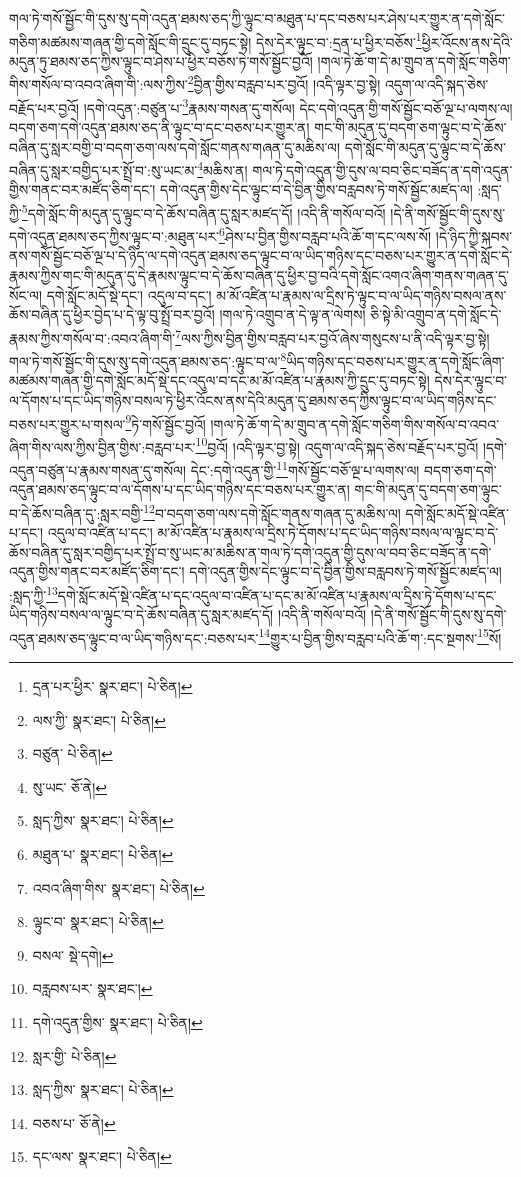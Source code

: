 གལ་ཏེ་གསོ་སྦྱོང་གི་དུས་སུ་དགེ་འདུན་ཐམས་ཅད་ཀྱི་ལྟུང་བ་མཐུན་པ་དང་བཅས་པར་ཤེས་པར་གྱུར་ན་དགེ་སློང་གཅིག་མཚམས་གཞན་གྱི་དགེ་སློང་གི་དྲུང་དུ་བཏང་སྟེ། དེས་དེར་ལྟུང་བ་:དྲན་པ་ཕྱིར་བཅོས་\footnote{དྲན་པར་ཕྱིར་  སྣར་ཐང་།  པེ་ཅིན། }ཕྱིར་འོངས་ནས་དེའི་མདུན་ཏུ་ཐམས་ཅད་ཀྱིས་ལྟུང་བ་ཤེས་པ་ཕྱིར་བཅོས་ཏེ་གསོ་སྦྱོང་བྱའོ། །གལ་ཏེ་ཆོ་ག་དེ་མ་གྲུབ་ན་དགེ་སློང་གཅིག་གིས་གསོལ་བ་འབའ་ཞིག་གི་:ལས་ཀྱིས་\footnote{ལས་ཀྱི་  སྣར་ཐང་།  པེ་ཅིན། }བྱིན་གྱིས་བརླབ་པར་བྱའོ། །འདི་ལྟར་བྱ་སྟེ། འདུག་ལ་འདི་སྐད་ཅེས་བརྗོད་པར་བྱའོ། །དགེ་འདུན་:བཙུན་པ་\footnote{བཙུན་  པེ་ཅིན། }རྣམས་གསན་དུ་གསོལ། དེང་དགེ་འདུན་གྱི་གསོ་སྦྱོང་བཅོ་ལྔ་པ་ལགས་ལ། བདག་ཅག་དགེ་འདུན་ཐམས་ཅད་ནི་ལྟུང་བ་དང་བཅས་པར་གྱུར་ན། གང་གི་མདུན་དུ་བདག་ཅག་ལྟུང་བ་དེ་ཆོས་བཞིན་དུ་སླར་བགྱི་བ་བདག་ཅག་ལས་དགེ་སློང་གནས་གཞན་དུ་མཆིས་ལ། དགེ་སློང་གི་མདུན་དུ་ལྟུང་བ་དེ་ཆོས་བཞིན་དུ་སླར་བགྱིད་པར་སྤྲོ་བ་:སུ་ཡང་མ་\footnote{སུ་ཡང་  ཅོ་ནེ། }མཆིས་ན། གལ་ཏེ་དགེ་འདུན་གྱི་དུས་ལ་བབ་ཅིང་བཟོད་ན་དགེ་འདུན་གྱིས་གནང་བར་མཛོད་ཅིག་དང་། དགེ་འདུན་གྱིས་དེང་ལྟུང་བ་དེ་བྱིན་གྱིས་བརླབས་ཏེ་གསོ་སྦྱོང་མཛད་ལ། :སླད་ཀྱི་\footnote{སླད་ཀྱིས་  སྣར་ཐང་།  པེ་ཅིན། }དགེ་སློང་གི་མདུན་དུ་ལྟུང་བ་དེ་ཆོས་བཞིན་དུ་སླར་མཛད་དོ། །འདི་ནི་གསོལ་བའོ། །དེ་ནི་གསོ་སྦྱོང་གི་དུས་སུ་དགེ་འདུན་ཐམས་ཅད་ཀྱིས་ལྟུང་བ་:མཐུན་པར་\footnote{མཐུན་པ་  སྣར་ཐང་།  པེ་ཅིན། }ཤེས་པ་བྱིན་གྱིས་བརླབ་པའི་ཆོ་ག་དང་ལས་སོ། །དེ་ཉིད་ཀྱི་སྐབས་ནས་གསོ་སྦྱོང་བཅོ་ལྔ་པ་དེ་ཉིད་ལ་དགེ་འདུན་ཐམས་ཅད་ལྟུང་བ་ལ་ཡིད་གཉིས་དང་བཅས་པར་གྱུར་ན་དགེ་སློང་དེ་རྣམས་ཀྱིས་གང་གི་མདུན་དུ་དེ་རྣམས་ལྟུང་བ་དེ་ཆོས་བཞིན་དུ་ཕྱིར་བྱ་བའི་དགེ་སློང་འགའ་ཞིག་གནས་གཞན་དུ་སོང་ལ། དགེ་སློང་མདོ་སྡེ་དང་། འདུལ་བ་དང་། མ་མོ་འཛིན་པ་རྣམས་ལ་དྲིས་ཏེ་ལྟུང་བ་ལ་ཡིད་གཉིས་བསལ་ནས་ཆོས་བཞིན་དུ་ཕྱིར་བྱེད་པ་དེ་ལྟ་བུ་སྤྲོ་བར་བྱའོ། །གལ་ཏེ་འགྲུབ་ན་དེ་ལྟ་ན་ལེགས། ཅི་སྟེ་མི་འགྲུབ་ན་དགེ་སློང་དེ་རྣམས་ཀྱིས་གསོལ་བ་:འབའ་ཞིག་གི་\footnote{འབའ་ཞིག་གིས་  སྣར་ཐང་།  པེ་ཅིན། }ལས་ཀྱིས་བྱིན་གྱིས་བརླབ་པར་བྱའོ་ཞེས་གསུངས་པ་ནི་འདི་ལྟར་བྱ་སྟེ། གལ་ཏེ་གསོ་སྦྱོང་གི་དུས་སུ་དགེ་འདུན་ཐམས་ཅད་:ལྟུང་བ་ལ་\footnote{ལྟུང་བ་  སྣར་ཐང་།  པེ་ཅིན། }ཡིད་གཉིས་དང་བཅས་པར་གྱུར་ན་དགེ་སློང་ཞིག་མཚམས་གཞན་གྱི་དགེ་སློང་མདོ་སྡེ་དང་འདུལ་བ་དང་མ་མོ་འཛིན་པ་རྣམས་ཀྱི་དྲུང་དུ་བཏང་སྟེ། དེས་དེར་ལྟུང་བ་ལ་དོགས་པ་དང་ཡིད་གཉིས་བསལ་ཏེ་ཕྱིར་འོངས་ནས་དེའི་མདུན་དུ་ཐམས་ཅད་ཀྱིས་ལྟུང་བ་ལ་ཡིད་གཉིས་དང་བཅས་པར་གྱུར་པ་གསལ་\footnote{བསལ་  སྡེ་དགེ། }ཏེ་གསོ་སྦྱོང་བྱའོ། །གལ་ཏེ་ཆོ་ག་དེ་མ་གྲུབ་ན་དགེ་སློང་གཅིག་གིས་གསོལ་བ་འབའ་ཞིག་གིས་ལས་ཀྱིས་བྱིན་གྱིས་:བརླབ་པར་\footnote{བརླབས་པར་  སྣར་ཐང་། }བྱའོ། །འདི་ལྟར་བྱ་སྟེ། འདུག་ལ་འདི་སྐད་ཅེས་བརྗོད་པར་བྱའོ། །དགེ་འདུན་བཙུན་པ་རྣམས་གསན་དུ་གསོལ། དེང་:དགེ་འདུན་གྱི་\footnote{དགེ་འདུན་གྱིས་  སྣར་ཐང་།  པེ་ཅིན། }གསོ་སྦྱོང་བཅོ་ལྔ་པ་ལགས་ལ། བདག་ཅག་དགེ་འདུན་ཐམས་ཅད་ལྟུང་བ་ལ་དོགས་པ་དང་ཡིད་གཉིས་དང་བཅས་པར་གྱུར་ན། གང་གི་མདུན་དུ་བདག་ཅག་ལྟུང་བ་དེ་ཆོས་བཞིན་དུ་:སླར་བགྱི་\footnote{སླར་གྱི་  པེ་ཅིན། }བ་བདག་ཅག་ལས་དགེ་སློང་གནས་གཞན་དུ་མཆིས་ལ། དགེ་སློང་མདོ་སྡེ་འཛིན་པ་དང་། འདུལ་བ་འཛིན་པ་དང་། མ་མོ་འཛིན་པ་རྣམས་ལ་དྲིས་ཏེ་དོགས་པ་དང་ཡིད་གཉིས་བསལ་ལ་ལྟུང་བ་དེ་ཆོས་བཞིན་དུ་སླར་བགྱིད་པར་སྤྲོ་བ་སུ་ཡང་མ་མཆིས་ན་གལ་ཏེ་དགེ་འདུན་གྱི་དུས་ལ་བབ་ཅིང་བཟོད་ན་དགེ་འདུན་གྱིས་གནང་བར་མཛོད་ཅིག་དང་། དགེ་འདུན་གྱིས་དེང་ལྟུང་བ་དེ་བྱིན་གྱིས་བརླབས་ཏེ་གསོ་སྦྱོང་མཛད་ལ། :སླད་ཀྱི་\footnote{སླད་ཀྱིས་  སྣར་ཐང་།  པེ་ཅིན། }དགེ་སློང་མདོ་སྡེ་འཛིན་པ་དང་འདུལ་བ་འཛིན་པ་དང་མ་མོ་འཛིན་པ་རྣམས་ལ་དྲིས་ཏེ་དོགས་པ་དང་ཡིད་གཉིས་བསལ་ལ་ལྟུང་བ་དེ་ཆོས་བཞིན་དུ་སླར་མཛད་དོ། །འདི་ནི་གསོལ་བའོ། །དེ་ནི་གསོ་སྦྱོང་གི་དུས་སུ་དགེ་འདུན་ཐམས་ཅད་ལྟུང་བ་ལ་ཡིད་གཉིས་དང་:བཅས་པར་\footnote{བཅས་པ་  ཅོ་ནེ། }གྱུར་པ་བྱིན་གྱིས་བརླབ་པའི་ཆོ་ག་:དང་སྔགས་\footnote{དང་ལས་  སྣར་ཐང་།  པེ་ཅིན། }སོ། 